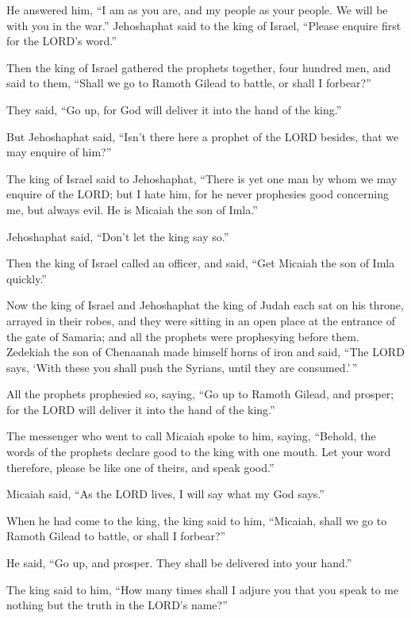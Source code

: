 He answered him, ``I am as you are, and my people as your people. We
will be with you in the war.''  Jehoshaphat said to the king
of Israel, ``Please enquire first for the LORD's word.''

 Then the king of Israel gathered the prophets together,
four hundred men, and said to them, ``Shall we go to Ramoth Gilead to
battle, or shall I forbear?''

They said, ``Go up, for God will deliver it into the hand of the king.''

 But Jehoshaphat said, ``Isn't there here a prophet of the
LORD besides, that we may enquire of him?''

 The king of Israel said to Jehoshaphat, ``There is yet one
man by whom we may enquire of the LORD; but I hate him, for he never
prophesies good concerning me, but always evil. He is Micaiah the son of
Imla.''

Jehoshaphat said, ``Don't let the king say so.''

 Then the king of Israel called an officer, and said, ``Get
Micaiah the son of Imla quickly.''

 Now the king of Israel and Jehoshaphat the king of Judah
each sat on his throne, arrayed in their robes, and they were sitting in
an open place at the entrance of the gate of Samaria; and all the
prophets were prophesying before them.  Zedekiah the son of
Chenaanah made himself horns of iron and said, ``The LORD says, `With
these you shall push the Syrians, until they are consumed.'\,''

 All the prophets prophesied so, saying, ``Go up to Ramoth
Gilead, and prosper; for the LORD will deliver it into the hand of the
king.''

 The messenger who went to call Micaiah spoke to him,
saying, ``Behold, the words of the prophets declare good to the king
with one mouth. Let your word therefore, please be like one of theirs,
and speak good.''

 Micaiah said, ``As the LORD lives, I will say what my God
says.''

 When he had come to the king, the king said to him,
``Micaiah, shall we go to Ramoth Gilead to battle, or shall I forbear?''

He said, ``Go up, and prosper. They shall be delivered into your hand.''

 The king said to him, ``How many times shall I adjure you
that you speak to me nothing but the truth in the LORD's name?''

